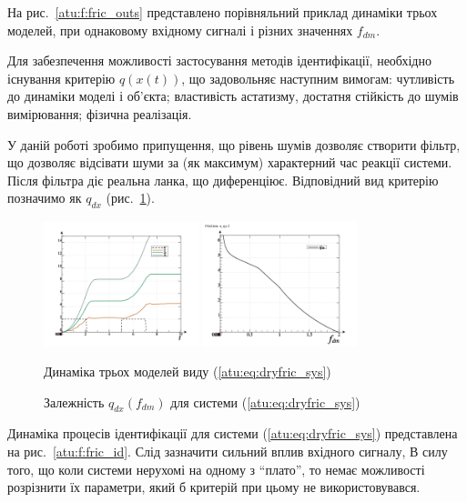 \documentclass[a4paper,13pt]{atuaref}
\begin{document}
На рис.~\ref{atu:f:fric_outs}
представлено порівняльний приклад динаміки трьох моделей,
при однаковому вхідному сигналі і різних значеннях $ f_ {dm} $.

Для забезпечення можливості застосування методів ідентифікації, необхідно
існування критерію $ q (x (t)) $, що задовольняє наступним вимогам: чутливість
до динаміки моделі і об'єкта; властивість астатизму, достатня стійкість до
шумів вимірювання; фізична реалізація.

У даній роботі зробимо припущення, що рівень шумів дозволяє створити фільтр, що
дозволяє відсівати шуми за (як максимум) характерний час реакції системи. Після
фільтра діє реальна ланка, що диференціює. Відповідний вид критерію позначимо як
$ q_{dx} $ (рис.~\ref{atu:f:fric_q}).


\begin{figure}[htb!]
  \includegraphics[width=0.40\textwidth]{p5/p/cha/fric/fric_outs.png} \hfill
  \includegraphics[width=0.40\textwidth]{p5/p/cha/fric/fric_p-p_f_dm_q.png}
  \\
  \parbox[t]{0.48\textwidth} {
    \caption{Динаміка трьох моделей виду (\ref{atu:eq:dryfric_sys})}
    \label{atu:f:fric_outs}
  } \hfill
  \parbox[t]{0.48\textwidth} {
    \caption{Залежність $q_{dx}(f_{dm})$ для системи (\ref{atu:eq:dryfric_sys}) }
    \label{atu:f:fric_q}
  }
\end{figure}

Динаміка процесів ідентифікації для системи (\ref{atu:eq:dryfric_sys})
представлена на рис.~\ref{atu:f:fric_id}. Слід зазначити
сильний вплив вхідного сигналу, В силу того, що коли системи нерухомі на одному
з ``плато'', то немає можливості розрізнити їх параметри, який б критерій при
цьому не використовувався.
\end{document}
